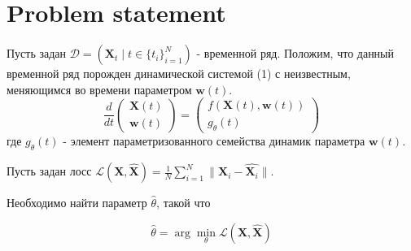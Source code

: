 \documentclass[a4paper,14pt]{article}
\theoremstyle{plain} %
\theoremstyle{definition} %
\theoremstyle{remark} %
\begin{document}
        \section{Problem statement}
        Пусть  задан \( \mathcal{D} = (\mathbf{X}_t \; | \; t \in \{ t_i \}_{i=1}^N )\) - временной ряд. Положим, что данный временной ряд порожден динамической системой (1) с неизвестным, меняющимся во времени параметром $\mathbf{w}(t)$.
        \begin{equation}
            \frac{d}{dt}
            \begin{pmatrix}
            \mathbf{X}(t) \\
            \mathbf{w}(t)
            \end{pmatrix}
            =
            \begin{pmatrix}
            f(\mathbf{X}(t), \mathbf{w}(t)) \\
            g_\theta(t)
            \end{pmatrix}
        \end{equation} где $g_\theta(t)$ - элемент параметризованного семейства динамик параметра $\mathbf{w}(t)$.

        Пусть задан лосс $\mathcal{L}(\mathbf{X}, \widehat{\mathbf{X}}) = \frac{1}{N} \sum\limits_{i = 1}^{N} \| \mathbf{X}_i - \widehat{\mathbf{X}_i}\|$.

        Необходимо найти параметр $\widehat{\theta}$, такой что

        \begin{equation}
            \widehat{\theta} = \arg\min_{\theta} \mathcal{L}(\mathbf{X}, \widehat{\mathbf{X}})
        \end{equation}

        
        
        
        
	\nocite{*}
        
\end{document}
